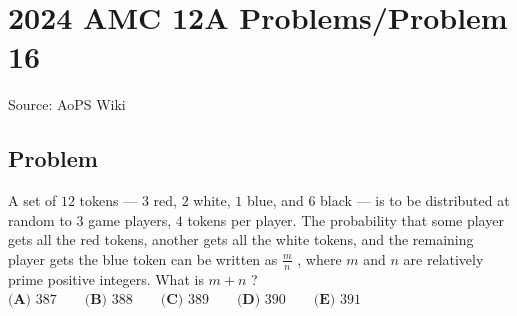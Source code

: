 \documentclass[12pt]{article}
\begin{document}
\section*{{2024 AMC 12A Problems/Problem 16}}
Source: AoPS Wiki

\subsection*{Problem}
A set of $12$ tokens — $3$ red, $2$ white, $1$ blue, and $6$ black — is to be distributed at random to $3$ game players, $4$ tokens per player. The probability that some player gets all the red tokens, another gets all the white tokens, and the remaining player gets the blue token can be written as $\frac{m}{n}$ , where $m$ and $n$ are relatively prime positive integers. What is $m+n$ ? $\textbf{(A) }387 \qquad \textbf{(B) }388 \qquad \textbf{(C) }389 \qquad \textbf{(D) }390 \qquad \textbf{(E) }391 \qquad$
\end{document}
